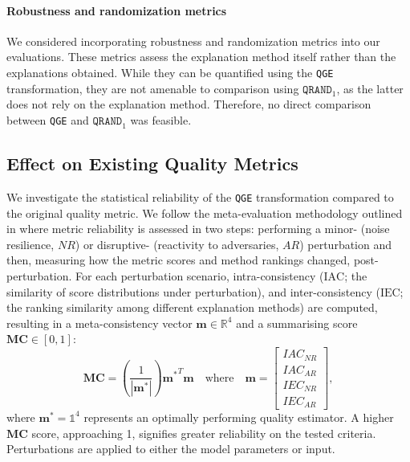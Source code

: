 \paragraph{Robustness and randomization metrics}
We considered incorporating robustness and randomization metrics into our evaluations. These metrics assess the explanation method itself rather than the explanations obtained. While they can be quantified using the \texttt{QGE} transformation, they are not amenable to comparison using $\texttt{QRAND}_1$, as the latter does not rely on the explanation method. Therefore, no direct comparison between \texttt{QGE} and $\texttt{QRAND}_1$ was feasible.

\subsection{Effect on Existing Quality Metrics}\label{sec:effect_on_metrics}

We investigate the statistical reliability of the \texttt{QGE} transformation compared to the original quality metric. 
We follow the meta-evaluation methodology outlined in \cite{hedstrom2023metaquantus} where metric reliability is assessed in two steps: performing a minor- (noise resilience, $NR$) or disruptive- (reactivity to adversaries, $AR$) perturbation and then, measuring how the metric scores and method rankings changed, post-perturbation. 
For each perturbation scenario, intra-consistency ($\text{IAC}$; the similarity of score distributions under perturbation), and inter-consistency ($\text{IEC}$; the ranking similarity among different explanation methods) are computed, resulting in a meta-consistency vector $\mathbf{m} \in \mathbb{R}^{4}$ and a summarising score $\mathbf{MC} \in [0, 1]$:
\begin{equation}
    \mathbf{MC} = \left(\frac{1}{|\mathbf{m^{*}}|}\right){\mathbf{m^{*}}}^T\mathbf{m} \quad \text{where} \quad \mathbf{m} = \begin{bmatrix} 
    {IAC}_{NR}\\
    {IAC}_{AR}\\
    {IEC}_{NR}\\ 
    {IEC}_{AR}
    \end{bmatrix},
    \label{eq:meta-eval-vector}
\end{equation}
where $\mathbf{m}^{*} = \mathbb{1}^4$
represents an optimally performing quality estimator. %
A higher $\mathbf{MC}$ score, approaching 1, signifies greater reliability on the tested criteria. Perturbations are applied to either the model parameters or input.

